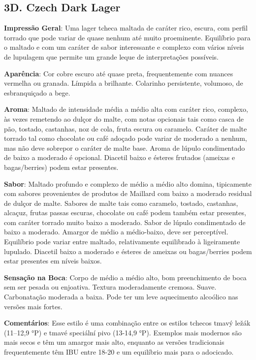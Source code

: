 \subsection*{3D. Czech Dark Lager}

\textbf{Impressão Geral}: Uma lager tcheca maltada de caráter rico, escura, com perfil torrado que pode variar de quase nenhum até muito proeminente. Equilíbrio para o maltado e com um caráter de sabor interessante e complexo com vários níveis de lupulagem que permite um grande leque de interpretações possíveis.

\textbf{Aparência}: Cor cobre escuro até quase preta, frequentemente com nuances vermelha ou granada. Límpida a brilhante. Colarinho persistente, volumoso, de esbranquiçado a bege.

\textbf{Aroma}: Maltado de intensidade média a médio alta com caráter rico, complexo, às vezes remetendo ao dulçor do malte, com notas opcionais tais como casca de pão, tostado, castanhas, noz de cola, fruta escura ou caramelo. Caráter de malte torrado tal como chocolate ou café adoçado pode variar de moderado a nenhum, mas não deve sobrepor o caráter de malte base. Aroma de lúpulo condimentado de baixo a moderado é opcional. Diacetil baixo e ésteres frutados (ameixas e bagas/berries) podem estar presentes.

\textbf{Sabor}: Maltado profundo e complexo de médio a médio alto domina, tipicamente com sabores provenientes de produtos de Maillard com baixo a moderado residual de dulçor de malte. Sabores de malte tais como caramelo, tostado, castanhas, alcaçuz, frutas passas escuras, chocolate ou café podem também estar presentes, com caráter torrado muito baixo a moderado. Sabor de lúpulo condimentado de baixo a moderado. Amargor de médio a médio-baixo, deve ser perceptível. Equilíbrio pode variar entre maltado, relativamente equilibrado à ligeiramente lupulado. Diacetil baixo a moderado e ésteres de ameixas ou bagas/berries podem estar presentes em níveis baixos.

\textbf{Sensação na Boca}: Corpo de médio a médio alto, bom preenchimento de boca sem ser pesada ou enjoativa. Textura moderadamente cremosa. Suave. Carbonatação moderada a baixa. Pode ter um leve aquecimento alcoólico nas versões mais fortes.

\textbf{Comentários}: Esse estilo é uma combinação entre os estilos tchecos tmavý ležák (11–12,9 °P) e tmavé speciální pivo (13-14,9 °P). Exemplos mais modernos são mais secos e têm um amargor mais alto, enquanto as versões tradicionais frequentemente têm IBU entre 18-20 e um equilíbrio mais para o adocicado.

